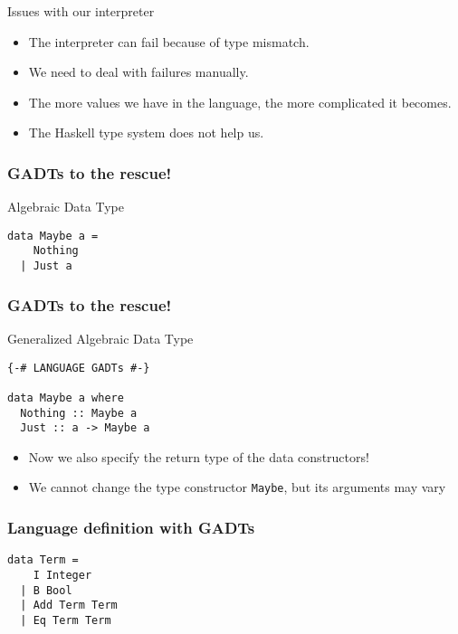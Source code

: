 \documentclass[pdftex,aspectratio=169]{beamer}
\begin{document}
\begin{frame}{Issues with our interpreter}
  \begin{itemize}[<+->]
\item The interpreter can fail because of type mismatch.
\item We need to deal with failures manually.
\item The more values we have in the language, the more complicated it becomes.
\item The Haskell type system does not help us.
\end{itemize}
\end{frame}

\begin{frame}[fragile]
  \frametitle{GADTs to the rescue!}

  \begin{block}{Algebraic Data Type}
    \begin{lstlisting}
data Maybe a =
    Nothing
  | Just a
\end{lstlisting}

  \end{block}
\end{frame}

\begin{frame}[fragile]
  \frametitle{GADTs to the rescue!}

  \begin{block}{Generalized Algebraic Data Type}
    \begin{lstlisting}
{-# LANGUAGE GADTs #-}

data Maybe a where
  Nothing :: Maybe a
  Just :: a -> Maybe a
\end{lstlisting}

  \end{block}\pause
  \begin{itemize}
  \item Now we also specify the return type of the data constructors!
  \item We cannot change the type constructor \lstinline{Maybe}, but
    its arguments may vary
  \end{itemize}
\end{frame}

\begin{frame}[fragile]
  \frametitle{Language definition with GADTs}
  \begin{block}{}
    \begin{lstlisting}
data Term =
    I Integer
  | B Bool
  | Add Term Term
  | Eq Term Term      
    \end{lstlisting}
  \end{block}
\end{frame}
\end{document}
